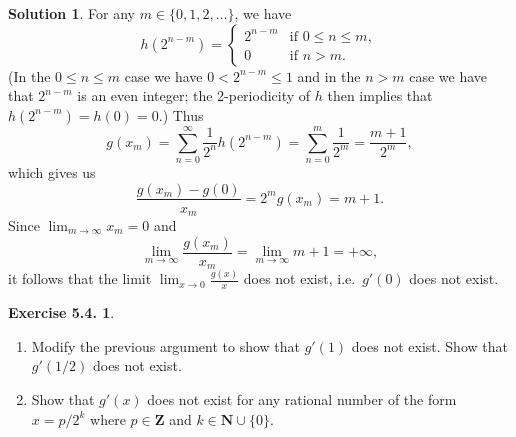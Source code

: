 \documentclass[12pt]{article}
\theoremstyle{definition}
\theoremstyle{exercise}
\newtheorem{exercise}{Exercise 5.4.}
\theoremstyle{solution}
\newtheorem*{solution}{Solution}
\newcommand{\N}{\mathbf{N}}
\newcommand{\Z}{\mathbf{Z}}
\begin{document}
\begin{solution}
    For any \( m \in \{ 0, 1, 2, \ldots \} \), we have
    \[
        h(2^{n - m}) = \begin{cases}
            2^{n - m} & \text{if } 0 \leq n \leq m, \\
            0 & \text{if } n > m.
        \end{cases}
    \]
    (In the \( 0 \leq n \leq m \) case we have \( 0 < 2^{n - m} \leq 1 \) and in the \( n > m \) case we have that \( 2^{n - m} \) is an even integer; the 2-periodicity of \( h \) then implies that \( h(2^{n - m}) = h(0) = 0 \).) Thus
    \[
        g(x_m) = \sum_{n=0}^{\infty} \frac{1}{2^n} h(2^{n - m}) = \sum_{n=0}^m \frac{1}{2^m} = \frac{m + 1}{2^m},
    \]
    which gives us
    \[
        \frac{g(x_m) - g(0)}{x_m} = 2^m g(x_m) = m + 1.
    \]
    Since \( \lim_{m \to \infty} x_m = 0 \) and
    \[
        \lim_{m \to \infty} \frac{g(x_m)}{x_m} = \lim_{m \to \infty} m + 1 = +\infty,
    \]
    it follows that the limit \( \lim_{x \to 0} \frac{g(x)}{x} \) does not exist, i.e.\ \( g'(0) \) does not exist.
\end{solution}

\begin{exercise}
\label{ex:6}
    \begin{enumerate}
        \item Modify the previous argument to show that \( g'(1) \) does not exist. Show that \( g'(1/2) \) does not exist.

        \item Show that \( g'(x) \) does not exist for any rational number of the form \( x = p/2^k \) where \( p \in \Z \) and \( k \in \N \cup \{ 0 \} \).
    \end{enumerate}
\end{exercise}
\end{document}
